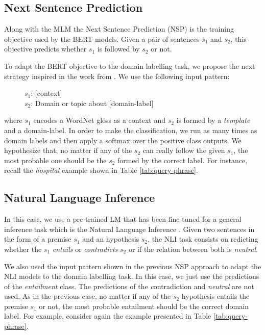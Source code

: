 \documentclass[11pt]{article}
\begin{document}
\subsection{Next Sentence Prediction}

Along with the MLM the Next Sentence Prediction (NSP) is the training objective used by the BERT models. Given a pair of sentences $s_1$ and $s_2$, this objective predicts whether $s_1$ is followed by $s_2$ or not.

To adapt the BERT objective to the domain labelling task, we propose the next strategy inspired in the work from . We use the following input pattern:

\begin{figure}[!ht]
    \centering
    \begin{displayquote}
        $s_1$: [context] \\
        $s_2$: Domain or topic about [domain-label]
    \end{displayquote}
    \label{fig:nsp_example}
\end{figure}

\noindent where $s_1$ encodes a WordNet gloss as a context and $s_2$ is formed by a \textit{template} and a domain-label. In order to make the classification, we run as many times as domain labels and then apply a softmax over the positive class outputs. We hypothesize that, no matter if any of the $s_2$ can really follow the given $s_1$, the most probable one should be the $s_2$ formed by the correct label. For instance, recall the {\it hospital} example shown in Table \ref{tab:query-phrase}.

\subsection{Natural Language Inference}

In this case, we use a pre-trained LM that has been fine-tuned for a general inference task which is the Natural Language Inference \cite{MNLI}. Given two sentences in the form of a premise $s_1$ and an hypothesis $s_2$, the NLI task consists on redicting whether the $s_1$ \textit{entails} or \textit{contradicts} $s_2$ or if the relation between both is \textit{neutral}. 







We also used the input pattern shown in the previous NSP approach to adapt the NLI models to the domain labelling task. In this case, we just use the predictions of the \textit{entailment} class. The predictions of the {\textit contradiction} and \textit{neutral} are not used. As in the previous case, no matter if any of the $s_2$ hypothesis entails the premise $s_1$ or not, the most probable entailment should be the correct domain label. For example, consider again the example presented in Table \ref{tab:query-phrase}.
\end{document}
